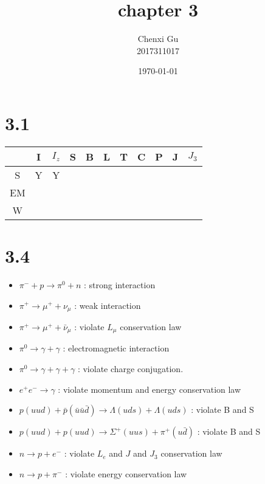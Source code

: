 \documentclass{article}
\begin{document}
\begin{CJK*}{GBK}{song}

\pagestyle{fancy}  
\fancyhead{} %
\renewcommand{\headrulewidth}{0.4pt}  
\renewcommand{\footrulewidth}{0.4pt} 



\title {chapter 3}
\author{Chenxi Gu\\2017311017}

\date{\today}

\maketitle

\section{3.1}
\begin{tabular}{|c|c|c|c|c|c|c|c|c|c|c|}
\hline  
     & I & $I_z$ & S & B & L & T & C & P & J & $J_3$\\
\hline  
S  & Y & Y &&&&&&&&\\
\hline %
EM  &&&&&&&&&&\\
\hline
W  &&&&&&&&&&\\
\hline
\end{tabular}

\section{3.4}

\begin{itemize}
\item $\pi^-+p\rightarrow\pi^0+n$  :  strong interaction
\item $\pi^+\rightarrow\mu^++\nu_{\mu}$  :  weak interaction
\item $\pi^+\rightarrow\mu^++\bar{\nu}_{\mu}$  :  violate $L_{\mu}$ conservation law
\item $\pi^0\rightarrow \gamma+\gamma$  :  electromagnetic interaction
\item $\pi^0\rightarrow \gamma+\gamma+\gamma$  :  violate charge conjugation.
\item $e^+e^-\rightarrow \gamma$  :  violate momentum and energy conservation law
\item $p(uud)+\bar{p}(\bar{u}\bar{u}\bar{d})\rightarrow \Lambda(uds)+\Lambda(uds)$  :  violate B and S
\item $p(uud)+p(uud)\rightarrow\Sigma^+(uus)+\pi^+(u\bar{d})$  :  violate B and S
\item $n\rightarrow p+e^-$  :  violate $L_e$ and $J$ and $J_3$ conservation law
\item $n\rightarrow p+\pi^-$  :  violate energy conservation law
\end{itemize}



\end{CJK*}
\end{document}
